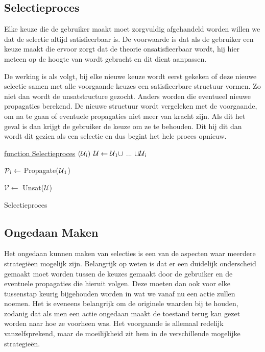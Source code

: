 \subsection{Selectieproces}
Elke keuze die de gebruiker maakt moet zorgvuldig afgehandeld worden willen we dat de selectie altijd satisfieerbaar is. De voorwaarde is dat als de gebruiker een keuze maakt die ervoor zorgt dat de theorie onsatisfieerbaar wordt, hij hier meteen op de hoogte van wordt gebracht en dit dient aanpassen. 

De werking is als volgt, bij elke nieuwe keuze wordt eerst gekeken of deze nieuwe selectie samen met alle voorgaande keuzes een satisfieerbare structuur vormen. Zo niet dan wordt de unsatstructure gezocht. Anders worden die eventueel nieuwe propagaties berekend. De nieuwe structuur wordt vergeleken met de voorgaande, om na te gaan of eventuele propagaties niet meer van kracht zijn. Als dit het geval is dan krijgt de gebruiker de keuze om ze te behouden. Dit hij dit dan wordt dit gezien als een selectie en dus begint het hele proces opnieuw. 

\begin{algorithm}
	\underline{function Selectieproces} $(\mathcal{U}\textsubscript{i})$ \;
	$\mathcal{U} \leftarrow \mathcal{U}\textsubscript{1}  \cup$ ... $\cup  \mathcal{U}\textsubscript{i}$\;
		{
		$\mathcal{P}\textsubscript{i} \leftarrow$ Propagate($\mathcal{U}\textsubscript{1}$)\;
		
		}
		{
		$\mathcal{V} \leftarrow$ Unsat($\mathcal{U}$)\; 
		}
	\caption{Selectieproces}
\end{algorithm}

\subsection{Ongedaan Maken}
Het ongedaan kunnen maken van selecties is een van de aspecten waar meerdere strategi\"{e}en mogelijk zijn. Belangrijk op weten is dat er een duidelijk onderscheid gemaakt moet worden tussen de keuzes gemaakt door de gebruiker en de eventuele propagaties die hieruit volgen. Deze moeten dan ook voor elke tussenstap keurig bijgehouden worden in wat we vanaf nu een actie zullen noemen. Het is eveneens belangrijk om de originele waarden bij te houden, zodanig dat als men een actie ongedaan maakt de toestand terug kan gezet worden naar hoe ze voorheen was. Het voorgaande is allemaal redelijk vanzelfsprekend, maar de moeilijkheid zit hem in de verschillende mogelijke strategie\"{e}n. 

